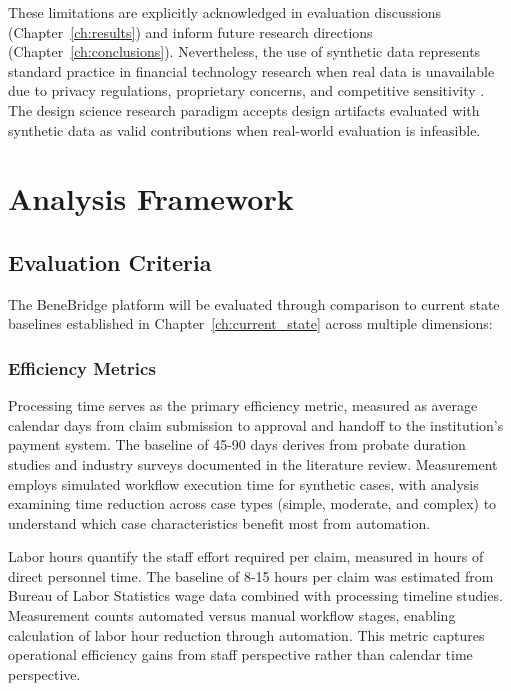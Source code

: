 These limitations are explicitly acknowledged in evaluation discussions (Chapter~\ref{ch:results}) and inform future research directions (Chapter~\ref{ch:conclusions}). Nevertheless, the use of synthetic data represents standard practice in financial technology research when real data is unavailable due to privacy regulations, proprietary concerns, and competitive sensitivity \citep{synthetic_financial_data_2023}. The design science research paradigm accepts design artifacts evaluated with synthetic data as valid contributions when real-world evaluation is infeasible.

\section{Analysis Framework}\label{sec:analysis_framework}

\subsection{Evaluation Criteria}

The BeneBridge platform will be evaluated through comparison to current state baselines established in Chapter~\ref{ch:current_state} across multiple dimensions:

\subsubsection{Efficiency Metrics}

Processing time serves as the primary efficiency metric, measured as average calendar days from claim submission to approval and handoff to the institution's payment system. The baseline of 45-90 days derives from probate duration studies and industry surveys documented in the literature review. Measurement employs simulated workflow execution time for synthetic cases, with analysis examining time reduction across case types (simple, moderate, and complex) to understand which case characteristics benefit most from automation.

Labor hours quantify the staff effort required per claim, measured in hours of direct personnel time. The baseline of 8-15 hours per claim was estimated from Bureau of Labor Statistics wage data combined with processing timeline studies. Measurement counts automated versus manual workflow stages, enabling calculation of labor hour reduction through automation. This metric captures operational efficiency gains from staff perspective rather than calendar time perspective.

